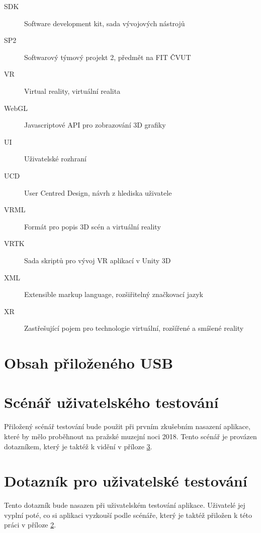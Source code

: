 \documentclass[thesis=B,czech]{FITthesis}[2012/06/26]
\begin{document}
\begin{description}
	\item[SDK] Software development kit, sada vývojových nástrojů 
	\item[SP2] Softwarový týmový projekt 2, předmět na FIT ČVUT
	\item[VR] Virtual reality, virtuální realita
    \item[WebGL] Javascriptové API pro zobrazování 3D grafiky
    \item[UI] Uživatelské rozhraní
    \item[UCD] User Centred Design, návrh z hlediska uživatele
    \item[VRML] Formát pro popis 3D scén a virtuální reality
    \item[VRTK] Sada skriptů pro vývoj VR aplikací v Unity 3D
	\item[XML] Extensible markup language, rozšiřitelný značkovací jazyk
	\item[XR] Zastřešující pojem pro technologie virtuální, rozšířené a smíšené reality
\end{description}


\chapter{Obsah přiloženého USB}


\begin{figure}
\end{figure}

\chapter{Scénář uživatelského testování} \label{sec:scenar}
Přiložený scénář testování bude použit při prvním zkušebním nasazení aplikace, které by mělo proběhnout na pražské muzejní noci 2018. Tento scénář je provázen dotazníkem, který je taktéž k vidění v příloze \ref{sec:dotaznik}.

\chapter{Dotazník pro uživatelské testování} \label{sec:dotaznik}
Tento dotazník bude nasazen při uživatelském testování aplikace. Uživatelé jej vyplní poté, co si aplikaci vyzkouší podle scénáře, který je taktéž přiložen k této práci v příloze \ref{sec:scenar}.


  
\end{document}
